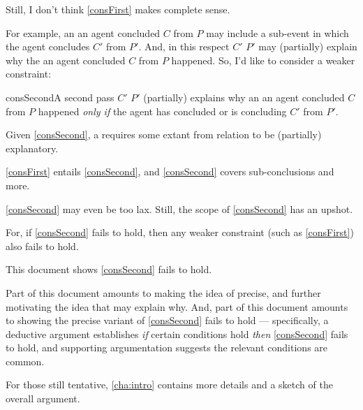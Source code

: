 \begin{note}
  Still, I don't think \autoref{consFirst} makes complete sense.

  For example, an  an agent concluded \(C\) from \(P\) may include a sub-event in which the agent concludes \(C'\) from \(P'\).
  And, in this respect \(C'\) \fingfr{} \(P'\) may (partially) explain why the  an agent concluded \(C\) from \(P\) happened.
  So, I'd like to consider a weaker constraint:

  \begin{constraint}{consSecond}{A second pass}
    \(C'\) \fingfr{} \(P'\) (partially) explains why an  an agent concluded \(C\) from \(P\) happened \emph{only if} the agent has concluded or is concluding \(C'\) from \(P'\).
  \end{constraint}

  \noindent%
  Given \autoref{consSecond}, a \fingfr{} requires some extant from relation to be (partially) explanatory.
\end{note}


\begin{note}
  \autoref{consFirst} entails \autoref{consSecond}, and \autoref{consSecond} covers sub-conclusions and more.

  \autoref{consSecond} may even be too lax.
  Still, the scope of \autoref{consSecond} has an upshot.
  
  For, if \autoref{consSecond} fails to hold, then any weaker constraint (such as \autoref{consFirst}) also fails to hold.
\end{note}

\begin{note}
  This document shows \autoref{consSecond} fails to hold.

  Part of this document amounts to making the idea of  precise, and further motivating the idea that  may explain why.
  And, part of this document amounts to showing the precise variant of \autoref{consSecond} fails to hold --- specifically, a deductive argument establishes \emph{if} certain conditions hold \emph{then} \autoref{consSecond} fails to hold, and supporting argumentation suggests the relevant conditions are common.

  For those still tentative, \autoref{cha:intro} contains more details and a sketch of the overall argument.
\end{note}


